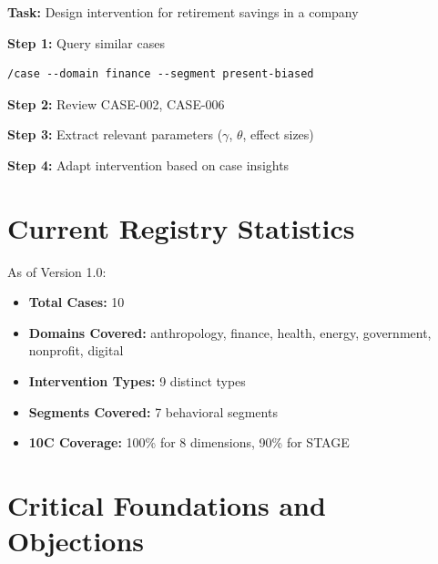 \begin{tcolorbox}[colback=gray!5, colframe=gray!50]
\textbf{Task:} Design intervention for retirement savings in a company

\textbf{Step 1:} Query similar cases
\begin{verbatim}
/case --domain finance --segment present-biased
\end{verbatim}

\textbf{Step 2:} Review CASE-002, CASE-006

\textbf{Step 3:} Extract relevant parameters ($\gamma$, $\theta$, effect sizes)

\textbf{Step 4:} Adapt intervention based on case insights
\end{tcolorbox}

\section{Current Registry Statistics}

As of Version 1.0:

\begin{itemize}
    \item \textbf{Total Cases:} 10
    \item \textbf{Domains Covered:} anthropology, finance, health, energy, government, nonprofit, digital
    \item \textbf{Intervention Types:} 9 distinct types
    \item \textbf{Segments Covered:} 7 behavioral segments
    \item \textbf{10C Coverage:} 100\% for 8 dimensions, 90\% for STAGE
\end{itemize}


\section{Critical Foundations and Objections}
\label{sec:cas-foundations}

